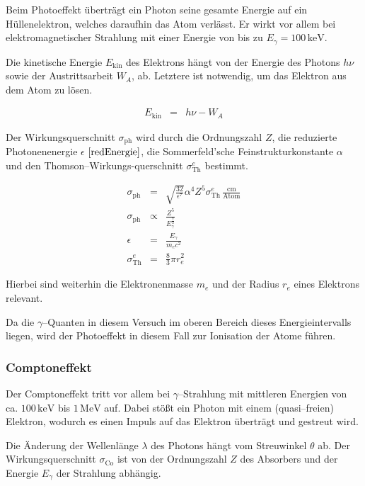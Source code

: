 \documentclass[12pt,a4paper]{scrartcl}
\numberwithin{equation}{section} %
\newcommand{\pu}[1]{\ensuremath{\mathrm{#1}}}
\begin{document}
Beim Photoeffekt überträgt ein Photon seine gesamte Energie auf ein Hüllenelektron, welches daraufhin das Atom verlässt. Er wirkt vor allem bei elektromagnetischer Strahlung mit einer Energie von bis zu $E_\gamma = \pu{100\, keV}$.

Die kinetische Energie $E_\mathrm{kin}$ des Elektrons hängt von der Energie des Photons $h\nu$ sowie der Austrittsarbeit $W_A$, ab. Letztere ist notwendig, um das Elektron aus dem Atom zu lösen.

\begin{eqnarray}
    E_\mathrm{kin} &=& h\nu - W_A
\end{eqnarray}

\noindent
Der Wirkungsquerschnitt $\sigma_\mathrm{ph}$ wird durch die Ordnungszahl $Z$, die reduzierte Photonenenergie $\epsilon$ $\eqref{redEnergie}$, die Sommerfeld'sche Feinstrukturkonstante $\alpha$ und den Thomson--\allowbreak Wirkungs-querschnitt $\sigma_\mathrm{Th}^e$ bestimmt. \cite{Bethge}

\begin{eqnarray}
    \sigma_\mathrm{ph}
        &=& \sqrt{\frac{32}{\epsilon^7}}\alpha^4 Z^5
            \sigma_\mathrm{Th}^e \pu{\,\frac{cm}{Atom}} \\
    \sigma_\mathrm{ph}
        &\propto& \frac{Z^5}{E_\gamma^{\frac{7}{2}}} \\
    \epsilon &=& \frac{E_\gamma}{m_ec^2} \label{redEnergie} \\
    \sigma_\mathrm{Th}^e &=& \frac{8}{3} \pi r_e^2
\end{eqnarray}

\noindent
Hierbei sind weiterhin die Elektronenmasse $m_e$ und der Radius $r_e$ eines Elektrons relevant.

Da die $\gamma$--Quanten in diesem Versuch im oberen Bereich dieses Energieintervalls liegen, wird der Photoeffekt in diesem Fall zur Ionisation der Atome führen.

\hypertarget{comptoneffekt}{%
\subsubsection{Comptoneffekt}\label{comptoneffekt}}

Der Comptoneffekt tritt vor allem bei $\gamma$--Strahlung mit mittleren Energien von ca. $\pu{100\, keV}$ bis $\pu{1\, MeV}$ auf. Dabei stößt ein Photon mit einem (quasi--freien) Elektron, wodurch es einen Impuls auf das Elektron überträgt und gestreut wird.

Die Änderung der Wellenlänge $\lambda$ des Photons hängt vom Streuwinkel $\theta$ ab. Der Wirkungsquerschnitt $\sigma_\mathrm{Co}$ ist von der Ordnungszahl $Z$ des Absorbers und der Energie $E_\gamma$ der Strahlung abhängig. \cite{Bethge}
\end{document}

